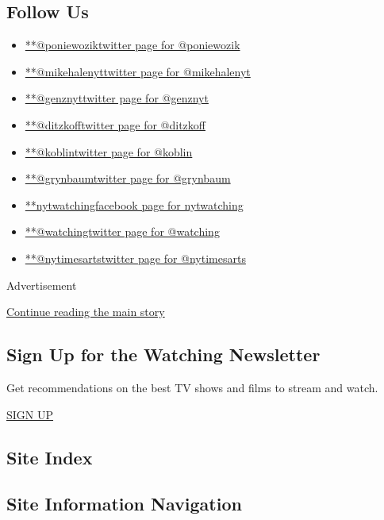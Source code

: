 \hypertarget{follow-us}{%
\subsection{Follow Us}\label{follow-us}}

\begin{itemize}
\tightlist
\item
  \href{https://twitter.com/poniewozik}{**@poniewoziktwitter page for
  @poniewozik}
\item
  \href{https://twitter.com/mikehalenyt}{**@mikehalenyttwitter page for
  @mikehalenyt}
\item
  \href{https://twitter.com/genznyt}{**@genznyttwitter page for
  @genznyt}
\item
  \href{https://twitter.com/ditzkoff}{**@ditzkofftwitter page for
  @ditzkoff}
\item
  \href{https://twitter.com/koblin}{**@koblintwitter page for @koblin}
\item
  \href{https://twitter.com/grynbaum}{**@grynbaumtwitter page for
  @grynbaum}
\item
  \href{https://www.facebook.com/nytwatching}{**nytwatchingfacebook page
  for nytwatching}
\item
  \href{https://twitter.com/watching}{**@watchingtwitter page for
  @watching}
\item
  \href{https://twitter.com/nytimesarts}{**@nytimesartstwitter page for
  @nytimesarts}
\end{itemize}

Advertisement

\protect\hyperlink{after-mktg}{Continue reading the main story}

\hypertarget{sign-up-for-the-watching-newsletter}{%
\subsection{Sign Up for the Watching
Newsletter}\label{sign-up-for-the-watching-newsletter}}

Get recommendations on the best TV shows and films to stream and watch.

\href{/newsletters/signup/WG}{SIGN UP}

\hypertarget{site-index}{%
\subsection{Site Index}\label{site-index}}

\hypertarget{site-information-navigation}{%
\subsection{Site Information
Navigation}\label{site-information-navigation}}


